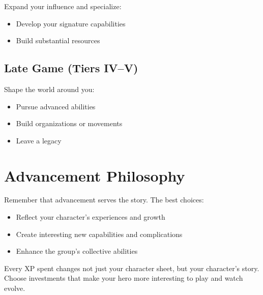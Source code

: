 \documentclass[11pt,twoside,openany]{book}
\begin{document}
Expand your influence and specialize:
\begin{itemize}
\item Develop your signature capabilities
\item Build substantial resources
\end{itemize}

\subsection*{Late Game (Tiers IV–V)}

Shape the world around you:
\begin{itemize}
\item Pursue advanced abilities
\item Build organizations or movements
\item Leave a legacy
\end{itemize}

\section*{Advancement Philosophy} 

Remember that advancement serves the story. The best choices:
\begin{itemize}
\item Reflect your character's experiences and growth
\item Create interesting new capabilities and complications
\item Enhance the group's collective abilities
\end{itemize}

\begin{tcolorbox}[colback=gray!5!white, colframe=gray!75!black, title=Final Thought, fonttitle=\bfseries]
Every XP spent changes not just your character sheet, but your character's story. Choose investments that make your hero more interesting to play and watch evolve.
\end{tcolorbox}
\end{document}
